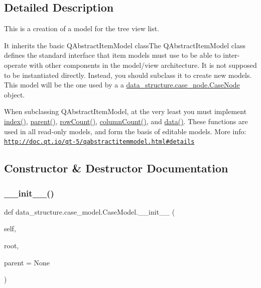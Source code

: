 \subsection{Detailed Description}
This is a creation of a model for the tree view list. 

It inherits the basic Q\+Abstract\+Item\+Model class\+The Q\+Abstract\+Item\+Model class defines the standard interface that item models must use to be able to inter-\/operate with other components in the model/view architecture. It is not supposed to be instantiated directly. Instead, you should subclass it to create new models. This model will be the one used by a a \hyperlink{a00086}{data\+\_\+structure.\+case\+\_\+node.\+Case\+Node} object.

When subclassing Q\+Abstract\+Item\+Model, at the very least you must implement \hyperlink{a00082_a3c52ee6daea1dc2ce7bb23833c761ed2}{index()}, \hyperlink{a00082_afa98c784f58d15bdb49c9ba85854ae03}{parent()}, \hyperlink{a00082_a44b390eef57be2a4883c1e6599b5a8ca}{row\+Count()}, \hyperlink{a00082_a132b1b7d95f07cae505b40b7fdeb4545}{column\+Count()}, and \hyperlink{a00082_a2f7291849d0efb3d7cff499d1cde0bf6}{data()}. These functions are used in all read-\/only models, and form the basis of editable models. More info\+: \href{http://doc.qt.io/qt-5/qabstractitemmodel.html#details}{\tt http\+://doc.\+qt.\+io/qt-\/5/qabstractitemmodel.\+html\#details} 

\subsection{Constructor \& Destructor Documentation}
\hypertarget{a00082_a7961b552537902b9236c2ded9cbfbc63}{}\label{a00082_a7961b552537902b9236c2ded9cbfbc63} 
\subsubsection{\texorpdfstring{\+\_\+\+\_\+init\+\_\+\+\_\+()}{\_\_init\_\_()}}
{\footnotesize\ttfamily def data\+\_\+structure.\+case\+\_\+model.\+Case\+Model.\+\_\+\+\_\+init\+\_\+\+\_\+ (\begin{DoxyParamCaption}\item[{}]{self,  }\item[{}]{root,  }\item[{}]{parent = {\ttfamily None} }\end{DoxyParamCaption})}



